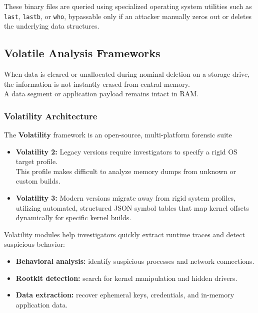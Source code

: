 \noindent
These binary files are queried using specialized operating system utilities such as \texttt{last}, \texttt{lastb}, or \texttt{who}, bypassable only if an attacker manually zeros out or deletes the underlying data structures.

\subsection{Volatile Analysis Frameworks}

When data is cleared or unallocated during nominal deletion on a storage drive, the information is not instantly erased from central memory.\\
A data segment or application payload remains intact in RAM. 

\subsubsection*{Volatility Architecture}
The \textbf{Volatility} framework is an open-source, multi-platform forensic suite

\begin{itemize}
    \item \textbf{Volatility 2:} Legacy versions require investigators to specify a rigid OS target profile.\\ This profile makes difficult to analyze memory dumps from unknown or custom builds.
    \item \textbf{Volatility 3:} Modern versions migrate away from rigid system profiles, utilizing automated, structured JSON symbol tables that map kernel offsets dynamically for specific kernel builds.
\end{itemize}

\noindent
Volatility modules help investigators quickly extract runtime traces and detect suspicious behavior:
\begin{itemize}
    \item \textbf{Behavioral analysis:} identify suspicious processes and network connections.
    \item \textbf{Rootkit detection:} search for kernel manipulation and hidden drivers.
    \item \textbf{Data extraction:} recover ephemeral keys, credentials, and in-memory application data.
\end{itemize}

